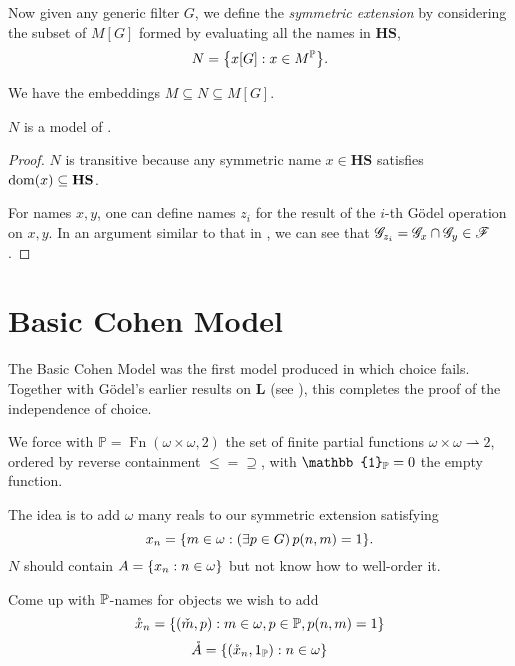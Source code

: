 \begin{definition}
    Now given any generic filter \(G\), we define the \emph{symmetric extension}
    by considering the subset of \(M[G]\) formed by evaluating all the names in \(\mathbf{HS}\),
    \[ N = \set{ x[G]: x\in M^{\mathbb{P}} }. \]
\end{definition}
\begin{observation}
    We have the embeddings \(M \subseteq N \subseteq M[G]\).
\end{observation}

\begin{theorem}
    \(N\) is a model of \ZF.
\end{theorem}
\begin{proof}
    \(N\) is transitive because any symmetric name \(x\in \mathbf{HS}\) satisfies \(\dom(x)\subseteq \mathbf{HS}\).

    For names \(x,y\), one can define names \(z_i\) for the result of the \(i\)-th Gödel operation on \(x, y\).
    In an argument similar to that in , we can see that \(\G_{z_i} = \G_x \cap \G_y \in \mathscr{F}\).

\end{proof}

\section{Basic Cohen Model}

The Basic Cohen Model was the first model produced in which choice fails.
Together with Gödel's earlier results on \(\mathbf{L}\) (see ),
this completes the proof of the independence of choice.

We force with \(\mathbb{P} = \operatorname{Fn}(\omega\times\omega, 2)\)
the set of finite partial functions \(\omega\times\omega \rightharpoonup 2\),
ordered by reverse containment \(\leq = \supseteq\),
with \(\mathbb{1}_\P = 0\) the empty function.

The idea is to add \(\omega\) many reals to our symmetric extension satisfying
\begin{equation} \label{basicCohen:property_x_n}
    x_n = \set{m\in\omega: \left(\exists p\in G\right) p(n,m) = 1}.
\end{equation}
\(N\) should contain \( A = \set{x_n:n\in \omega } \) but not know how to well-order it.

Come up with \(\P\)-names for objects we wish to add
\[ \mathring{x}_n = \set{(\check{m},p): m\in\omega, p\in\P,p(n,m) = 1} \]
\[ \mathring{A} = \set{(\mathring{x}_n,1_\P): n\in\omega} \]



